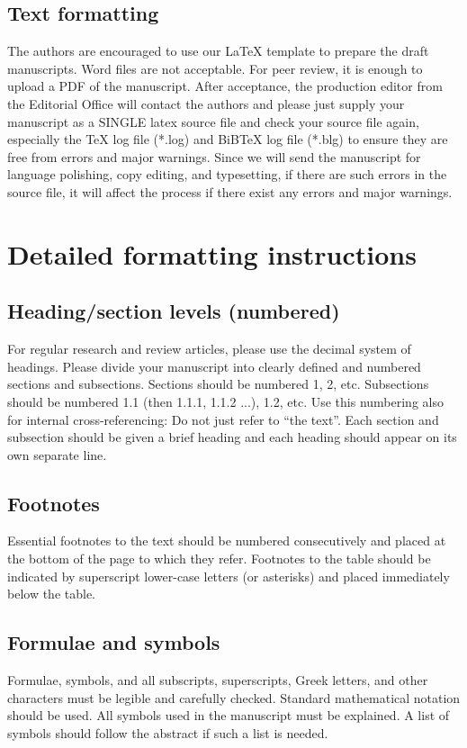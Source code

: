 \documentclass{CVM}
\begin{document}
\subsection{Text formatting}
The authors are encouraged to use our LaTeX template to prepare the draft
manuscripts. Word files are not acceptable. For peer review, it is enough to upload a PDF of the manuscript. After acceptance, the production editor from the Editorial Office will contact the authors and please just supply your
manuscript as a SINGLE latex source file and check your source file again,
especially the TeX log file (*.log) and BiBTeX log file (*.blg) to ensure
they are free from errors and major warnings. Since we will send the
manuscript for language polishing, copy editing, and typesetting, if there
are such errors in the source file, it will affect the process if there
exist any errors and major warnings.

\section{Detailed formatting instructions}

\subsection{Heading/section levels (numbered)}
For regular research and review articles, please use the decimal system of
headings. Please divide your manuscript into clearly defined and numbered
sections and subsections. Sections should be numbered 1, 2, etc. Subsections
should be numbered 1.1 (then 1.1.1, 1.1.2 ...), 1.2, etc. Use
this numbering also for internal cross-referencing: Do not just refer to
``the text''. Each section and subsection should be given a brief heading
and each heading should appear on its own separate line.

\subsection{Footnotes}
Essential footnotes to the text should be numbered consecutively and placed
at the bottom of the page to which they refer. Footnotes to the table should
be indicated by superscript lower-case letters (or asterisks) and placed
immediately below the table.

\subsection{Formulae and symbols}
Formulae, symbols, and all subscripts, superscripts, Greek letters, and
other characters must be legible and carefully checked. Standard
mathematical notation should be used. All symbols used in the manuscript
must be explained. A list of symbols should follow the abstract if such a
list is needed.
\end{document}
